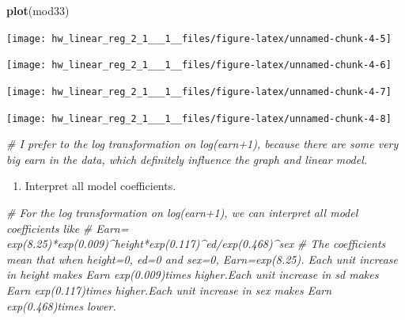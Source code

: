 \documentclass[]{article}
\newenvironment{Shaded}{\begin{snugshade}}{\end{snugshade}}
\newcommand{\KeywordTok}[1]{\textcolor[rgb]{0.13,0.29,0.53}{\textbf{#1}}}
\newcommand{\CommentTok}[1]{\textcolor[rgb]{0.56,0.35,0.01}{\textit{#1}}}
\newcommand{\NormalTok}[1]{#1}
\providecommand{\tightlist}{%
  \setlength{\itemsep}{0pt}\setlength{\parskip}{0pt}}
\begin{document}
\begin{Shaded}
\begin{Highlighting}[]
\KeywordTok{plot}\NormalTok{(mod33)}
\end{Highlighting}
\end{Shaded}

\begin{center}\texttt{[image: hw\_linear\_reg\_2\_1\_\_\_1\_\_files/figure-latex/unnamed-chunk-4-5]} \end{center}

\begin{center}\texttt{[image: hw\_linear\_reg\_2\_1\_\_\_1\_\_files/figure-latex/unnamed-chunk-4-6]} \end{center}

\begin{center}\texttt{[image: hw\_linear\_reg\_2\_1\_\_\_1\_\_files/figure-latex/unnamed-chunk-4-7]} \end{center}

\begin{center}\texttt{[image: hw\_linear\_reg\_2\_1\_\_\_1\_\_files/figure-latex/unnamed-chunk-4-8]} \end{center}

\begin{Shaded}
\begin{Highlighting}[]
\CommentTok{# I prefer to the log transformation on log(earn+1), because there are some very big earn in the data, which definitely influence the graph and linear model.}
\end{Highlighting}
\end{Shaded}

\begin{enumerate}
\def\labelenumi{\arabic{enumi}.}
\setcounter{enumi}{3}
\tightlist
\item
  Interpret all model coefficients.
\end{enumerate}

\begin{Shaded}
\begin{Highlighting}[]
\CommentTok{# For the  log transformation on log(earn+1), we can interpret all model coefficients like }
\CommentTok{# Earn= exp(8.25)*exp(0.009)^height*exp(0.117)^ed/exp(0.468)^sex}
\CommentTok{# The coefficients mean that when height=0, ed=0 and sex=0, Earn=exp(8.25). Each unit increase in height makes Earn exp(0.009)times higher.Each unit increase in sd makes Earn exp(0.117)times higher.Each unit increase in sex makes Earn exp(0.468)times lower.}
\end{Highlighting}
\end{Shaded}
\end{document}
